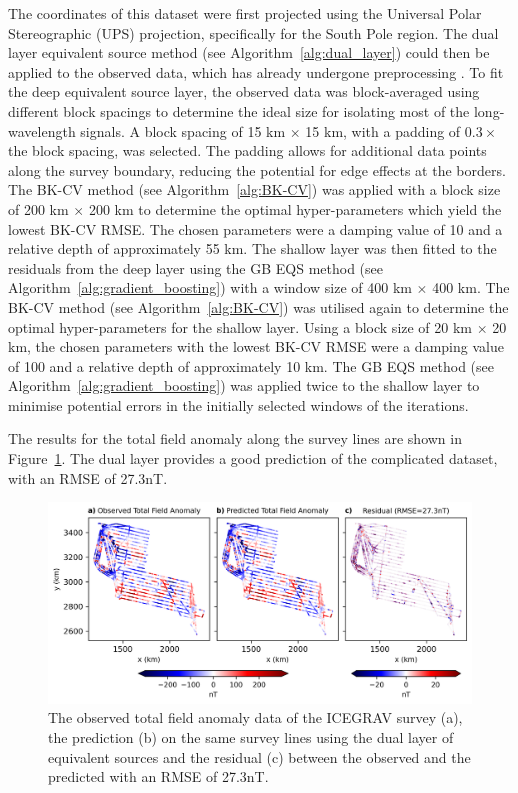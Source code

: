 The coordinates of this dataset were first projected using the Universal Polar Stereographic (UPS) projection, specifically for the South Pole region. The dual layer equivalent source method (see Algorithm~\ref{alg:dual_layer}) could then be applied to the observed data, which has already undergone preprocessing \citep{ICEGRAV_data}. To fit the deep equivalent source layer, the observed data was block-averaged using different block spacings to determine the ideal size for isolating most of the long-wavelength signals. A block spacing of 15 km $\times$ 15 km, with a padding of $ 0.3 \times $ the block spacing, was selected. The padding allows for additional data points along the survey boundary, reducing the potential for edge effects at the borders. The BK-CV method (see Algorithm~\ref{alg:BK-CV}) was applied with a block size of 200 km $\times$ 200 km to determine the optimal hyper-parameters which yield the lowest BK-CV RMSE. The chosen parameters were a damping value of 10 and a relative depth of approximately 55 km. The shallow layer was then fitted to the residuals from the deep layer using the GB EQS method (see Algorithm~\ref{alg:gradient_boosting}) with a window size of 400 km $\times$ 400 km. The BK-CV method (see Algorithm~\ref{alg:BK-CV}) was utilised again to determine the optimal hyper-parameters for the shallow layer. Using a block size of 20 km $\times$ 20 km, the chosen parameters with the lowest BK-CV RMSE were a damping value of 100 and a relative depth of approximately 10 km. The GB EQS method (see Algorithm~\ref{alg:gradient_boosting}) was applied twice to the shallow layer to minimise potential errors in the initially selected windows of the iterations.

The results for the total field anomaly along the survey lines are shown in Figure~\ref{fig:real_line_pred}. The dual layer provides a good prediction of the complicated dataset, with an RMSE of 27.3nT.

\begin{figure}[!h]
\centering
\includegraphics[width=1\linewidth]{paper/figures/real_line_pred.png}
\caption{
    The observed total field anomaly data of the ICEGRAV survey \citep{ICEGRAV_data} (a), the prediction (b) on the same survey lines using the dual layer of equivalent sources and the residual (c) between the observed and the predicted with an RMSE of 27.3nT.
}
\label{fig:real_line_pred}
\end{figure}

